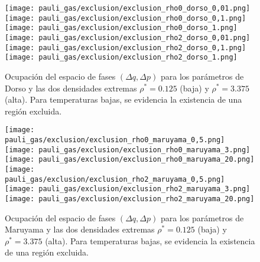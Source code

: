 \begin{figure}[H]
	\centering	%
	\texttt{[image: pauli\_gas/exclusion/exclusion\_rho0\_dorso\_0,01.png]}
	\texttt{[image: pauli\_gas/exclusion/exclusion\_rho0\_dorso\_0,1.png]}
	\texttt{[image: pauli\_gas/exclusion/exclusion\_rho0\_dorso\_1.png]}
	\texttt{[image: pauli\_gas/exclusion/exclusion\_rho2\_dorso\_0,01.png]}
	\texttt{[image: pauli\_gas/exclusion/exclusion\_rho2\_dorso\_0,1.png]}
	\texttt{[image: pauli\_gas/exclusion/exclusion\_rho2\_dorso\_1.png]}
	\caption{Ocupación del espacio de fases $(\Delta q, \Delta p)$ para los parámetros de Dorso y las dos densidades extremas $\rho^*=0.125$ (baja) y $\rho^*=3.375$ (alta).
  Para temperaturas bajas, se evidencia la existencia de una región excluida.}
	\label{fig:exclusion_dorso}
\end{figure}
\begin{figure}[H]
	\centering	%
	\texttt{[image: pauli\_gas/exclusion/exclusion\_rho0\_maruyama\_0,5.png]}
	\texttt{[image: pauli\_gas/exclusion/exclusion\_rho0\_maruyama\_3.png]}
	\texttt{[image: pauli\_gas/exclusion/exclusion\_rho0\_maruyama\_20.png]}
	\texttt{[image: pauli\_gas/exclusion/exclusion\_rho2\_maruyama\_0,5.png]}
	\texttt{[image: pauli\_gas/exclusion/exclusion\_rho2\_maruyama\_3.png]}
	\texttt{[image: pauli\_gas/exclusion/exclusion\_rho2\_maruyama\_20.png]}
	\caption{Ocupación del espacio de fases $(\Delta q, \Delta p)$ para los parámetros de Maruyama y las dos densidades extremas $\rho^*=0.125$ (baja) y $\rho^*=3.375$ (alta).
  Para temperaturas bajas, se evidencia la existencia de una región excluida.}
	\label{fig:exclusion_maruyama}
\end{figure}

